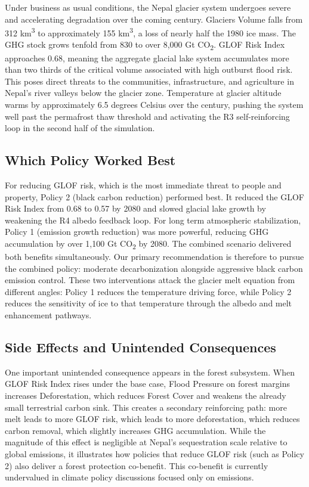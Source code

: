 \documentclass[12pt, a4paper]{article}
\begin{document}
Under business as usual conditions, the Nepal glacier system undergoes severe and accelerating degradation over the coming century. Glaciers Volume falls from 312 km\textsuperscript{3} to approximately 155 km\textsuperscript{3}, a loss of nearly half the 1980 ice mass. The GHG stock grows tenfold from 830 to over 8,000 Gt CO\textsubscript{2}. GLOF Risk Index approaches 0.68, meaning the aggregate glacial lake system accumulates more than two thirds of the critical volume associated with high outburst flood risk. This poses direct threats to the communities, infrastructure, and agriculture in Nepal's river valleys below the glacier zone. Temperature at glacier altitude warms by approximately 6.5 degrees Celsius over the century, pushing the system well past the permafrost thaw threshold and activating the R3 self-reinforcing loop in the second half of the simulation.

\subsection{Which Policy Worked Best}

For reducing GLOF risk, which is the most immediate threat to people and property, Policy 2 (black carbon reduction) performed best. It reduced the GLOF Risk Index from 0.68 to 0.57 by 2080 and slowed glacial lake growth by weakening the R4 albedo feedback loop. For long term atmospheric stabilization, Policy 1 (emission growth reduction) was more powerful, reducing GHG accumulation by over 1,100 Gt CO\textsubscript{2} by 2080. The combined scenario delivered both benefits simultaneously. Our primary recommendation is therefore to pursue the combined policy: moderate decarbonization alongside aggressive black carbon emission control. These two interventions attack the glacier melt equation from different angles: Policy 1 reduces the temperature driving force, while Policy 2 reduces the sensitivity of ice to that temperature through the albedo and melt enhancement pathways.

\subsection{Side Effects and Unintended Consequences}

One important unintended consequence appears in the forest subsystem. When GLOF Risk Index rises under the base case, Flood Pressure on forest margins increases Deforestation, which reduces Forest Cover and weakens the already small terrestrial carbon sink. This creates a secondary reinforcing path: more melt leads to more GLOF risk, which leads to more deforestation, which reduces carbon removal, which slightly increases GHG accumulation. While the magnitude of this effect is negligible at Nepal's sequestration scale relative to global emissions, it illustrates how policies that reduce GLOF risk (such as Policy 2) also deliver a forest protection co-benefit. This co-benefit is currently undervalued in climate policy discussions focused only on emissions.
\end{document}
